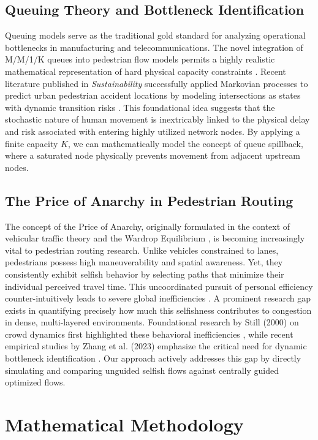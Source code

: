 \documentclass[conference]{IEEEtran}
\begin{document}
\subsection{Queuing Theory and Bottleneck Identification}
Queuing models serve as the traditional gold standard for analyzing operational bottlenecks in manufacturing and telecommunications. The novel integration of M/M/1/K queues into pedestrian flow models permits a highly realistic mathematical representation of hard physical capacity constraints \cite{b2}. Recent literature published in \textit{Sustainability} successfully applied Markovian processes to predict urban pedestrian accident locations by modeling intersections as states with dynamic transition risks \cite{b2}. This foundational idea suggests that the stochastic nature of human movement is inextricably linked to the physical delay and risk associated with entering highly utilized network nodes. By applying a finite capacity $K$, we can mathematically model the concept of queue spillback, where a saturated node physically prevents movement from adjacent upstream nodes.

\subsection{The Price of Anarchy in Pedestrian Routing}
The concept of the Price of Anarchy, originally formulated in the context of vehicular traffic theory and the Wardrop Equilibrium \cite{b7}, is becoming increasingly vital to pedestrian routing research. Unlike vehicles constrained to lanes, pedestrians possess high maneuverability and spatial awareness. Yet, they consistently exhibit selfish behavior by selecting paths that minimize their individual perceived travel time. This uncoordinated pursuit of personal efficiency counter-intuitively leads to severe global inefficiencies \cite{b8}. A prominent research gap exists in quantifying precisely how much this selfishness contributes to congestion in dense, multi-layered environments. Foundational research by Still (2000) on crowd dynamics first highlighted these behavioral inefficiencies \cite{b9}, while recent empirical studies by Zhang et al. (2023) emphasize the critical need for dynamic bottleneck identification \cite{b10}. Our approach actively addresses this gap by directly simulating and comparing unguided selfish flows against centrally guided optimized flows.

\section{Mathematical Methodology}
\end{document}
